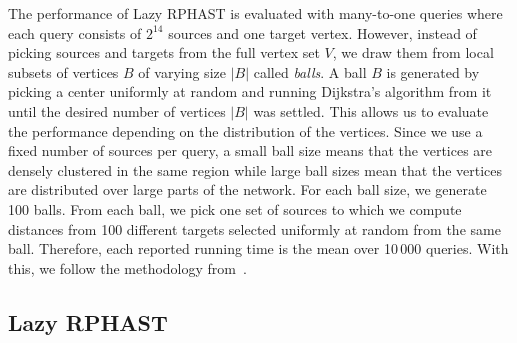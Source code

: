 \documentclass[manuscript,review]{acmart}
\begin{document}
The performance of Lazy RPHAST is evaluated with many-to-one queries where each query consists of $2^{14}$ sources and one target vertex.
However, instead of picking sources and targets from the full vertex set $V$, we draw them from local subsets of vertices $B$ of varying size $|B|$ called \emph{balls}.
A ball $B$ is generated by picking a center uniformly at random and running Dijkstra's algorithm from it until the desired number of vertices $|B|$ was settled.
This allows us to evaluate the performance depending on the distribution of the vertices.
Since we use a fixed number of sources per query, a small ball size means that the vertices are densely clustered in the same region while large ball sizes mean that the vertices are distributed over large parts of the network.
For each ball size, we generate 100 balls.
From each ball, we pick one set of sources to which we compute distances from 100 different targets selected uniformly at random from the same ball.
Therefore, each reported running time is the mean over 10\,000 queries.
With this, we follow the methodology from~\cite{delling_et_al:OASIcs:2011:3266}.

\subsection{Lazy RPHAST}\label{sec:exp_lazy_rphast}
\end{document}
